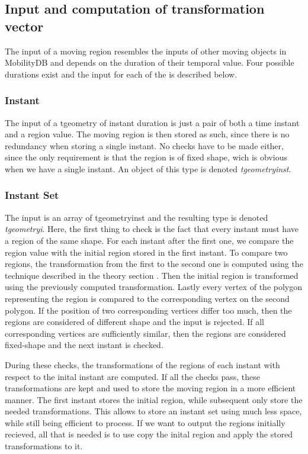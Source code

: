 	\subsection{Input and computation of transformation vector}
	
	The input of a moving region resembles the inputs of other moving objects in MobilityDB and depends on the duration of their temporal value. Four possible durations exist and the input for each of the is described below.
	
		\subsubsection{Instant}
		
		The input of a tgeometry of instant duration is just a pair of both a time instant and a region value. The moving region is then stored as such, since there is no redundancy when storing a single instant. No checks have to be made either, since the only requirement is that the region is of fixed shape, wich is obvious when we have a single instant. An object of this type is denoted \textit{tgeometryinst}.
			
		\subsubsection{Instant Set}
		
		The input is an array of tgeometryinst and the resulting type is denoted \textit{tgeometryi}. Here, the first thing to check is the fact that every instant must have a region of the same shape. For each instant after the first one, we compare the region value with the initial region stored in the first instant. To compare two regions, the transformation from the first to the second one is computed using the technique described in the theory section . Then the initial region is transformed using the previously computed transformation. Lastly every vertex of the polygon representing the region is compared to the corresponding vertex on the second polygon. If the position of two corresponding vertices differ too much, then the regions are considered of different shape and the input is rejected. If all corresponding vertices are sufficiently similar, then the regions are considered fixed-shape and the next instant is checked.
			
		During these checks, the transformations of the regions of each instant with respect to the inital instant are computed. If all the checks pass, these transformations are kept and used to store the moving region in a more efficient manner. The first instant stores the initial region, while subsequent only store the needed transformations. This allows to store an instant set using much less space, while still being efficient to process. If we want to output the regions initially recieved, all that is needed is to use copy the inital region and apply the stored transformations to it.  
		
